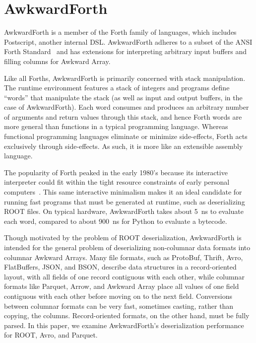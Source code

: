 \documentclass{webofc}
\begin{document}
\section{AwkwardForth}

AwkwardForth is a member of the Forth family of languages, which includes Postscript, another internal DSL. AwkwardForth adheres to a subset of the ANSI Forth Standard~\cite{forth-standard} and has extensions for interpreting arbitrary input buffers and filling columns for Awkward Array.

Like all Forths, AwkwardForth is primarily concerned with stack manipulation. The runtime environment features a stack of integers and programs define ``words'' that manipulate the stack (as well as input and output buffers, in the case of AwkwardForth). Each word consumes and produces an arbitrary number of arguments and return values through this stack, and hence Forth words are more general than functions in a typical programming language. Whereas functional programming languages eliminate or minimize side-effects, Forth acts exclusively through side-effects. As such, it is more like an extensible assembly language.

The popularity of Forth peaked in the early 1980's because its interactive interpreter could fit within the tight resource constraints of early personal computers~\cite{forth}. This same interactive minimalism makes it an ideal candidate for running fast programs that must be generated at runtime, such as deserializing ROOT files. On typical hardware, AwkwardForth takes about 5~ns to evaluate each word, compared to about 900~ns for Python to evaluate a bytecode.

Though motivated by the problem of ROOT deserialization, AwkwardForth is intended for the general problem of deserializing non-columnar data formats into columnar Awkward Arrays. Many file formats, such as ProtoBuf, Thrift, Avro, FlatBuffers, JSON, and BSON, describe data structures in a record-oriented layout, with all fields of one record contiguous with each other, while columnar formats like Parquet, Arrow, and Awkward Array place all values of one field contiguous with each other before moving on to the next field. Conversions between columnar formats can be very fast, sometimes casting, rather than copying, the columns. Record-oriented formats, on the other hand, must be fully parsed. In this paper, we examine AwkwardForth's deserialization performance for ROOT, Avro, and Parquet.
\end{document}
